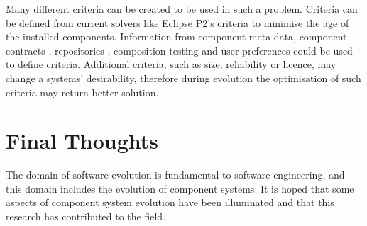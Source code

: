 


Many different criteria can be created to be used in such a problem.
Criteria can be defined from current solvers like Eclipse P2's criteria to minimise the age of the installed components.
Information from component meta-data, component contracts \citep{Watkins1999}, repositories \citep{Guo2000}, 
composition testing \citep{XuejieZhang2008} and user preferences could be used to define criteria.
Additional criteria, such as size, reliability or licence, may change a systems' desirability, 
therefore during evolution the optimisation of such criteria may return better solution.




\section{Final Thoughts}
The domain of software evolution is fundamental to software engineering, and this domain includes the evolution of component systems.
It is hoped that some aspects of component system evolution have been illuminated and that this research has contributed to the field. 

 
